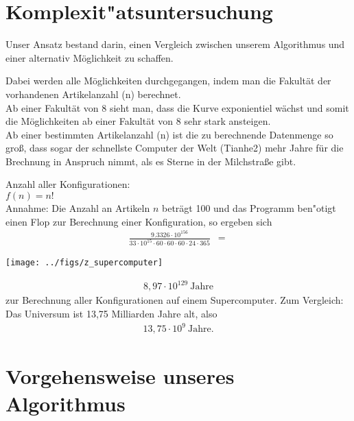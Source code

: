 \documentclass[pagenumoff]{kit-document}
\begin{document}
	
	
	\section{Komplexit"atsuntersuchung}
	
	Unser Ansatz bestand darin, einen Vergleich zwischen unserem Algorithmus und einer alternativ Möglichkeit zu schaffen.
        
Dabei werden alle Möglichkeiten durchgegangen, indem man die Fakultät der vorhandenen Artikelanzahl (n) berechnet.\\ 
Ab einer Fakultät von 8 sieht man, dass die Kurve exponientiel wächst und somit die Möglichkeiten ab einer Fakultät von 8 sehr stark ansteigen.\\ Ab einer bestimmten Artikelanzahl (n) ist die zu berechnende Datenmenge so groß, dass sogar der schnellste Computer der Welt (Tianhe2) mehr Jahre für die Brechnung in Anspruch nimmt, als es Sterne in der Milchstraße gibt.

	
  	   Anzahl aller Konfigurationen: \\
		 $f(n)=n!$ \\
 	    Annahme: Die Anzahl an Artikeln $n$ beträgt 100 und das Programm ben"otigt einen Flop zur Berechnung einer Konfiguration, so ergeben sich 
   		\begin{align*}
  		  \frac{9.3326\cdot10^{156}}{33\cdot10^{15}\cdot60\cdot60\cdot60\cdot24\cdot365} \enspace = 
  		\end{align*}

    \begin{center}
    \texttt{[image: ../figs/z\_supercomputer]}
    \end{center}
     \begin{align*}
      8,97\cdot 10^{129}  \ \text{Jahre}
   \end{align*}  
   zur Berechnung aller Konfigurationen auf einem Supercomputer.
   Zum Vergleich: Das Universum ist 13,75 Milliarden Jahre alt, also
   \begin{align*}
      13,75\cdot10^{9}  \ \text{Jahre.}
   \end{align*}
    
   		\section{Vorgehensweise unseres Algorithmus}
\end{document}
